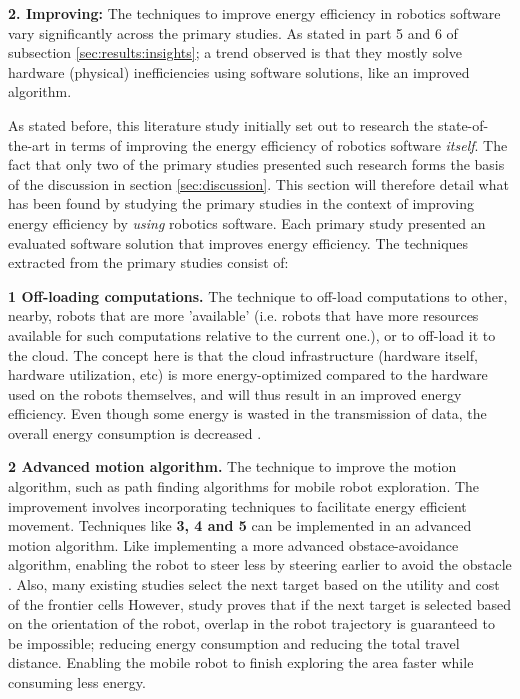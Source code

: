 \vspace{2mm}

\noindent\textbf{2. Improving:}
The techniques to improve energy efficiency in robotics software vary significantly across the primary studies. 
As stated in part 5 and 6 of subsection \ref{sec:results:insights}; a trend observed is that they mostly solve hardware (physical) 
inefficiencies using software solutions, like an improved algorithm.

As stated before, this literature study initially set out to research the state-of-the-art in terms of improving the
energy efficiency of robotics software \textit{itself}.
The fact that only two of the primary studies presented such research forms the basis of the discussion in section \ref{sec:discussion}. 
This section will therefore detail what has been found by studying the primary studies in the context of improving energy efficiency 
by \textit{using} robotics software.
Each primary study presented an evaluated software solution that improves energy efficiency.
The techniques extracted from the primary studies consist of:

\vspace{1mm}

\textbf{1 Off-loading computations.} The technique to off-load computations to other, nearby, robots that are more 'available' 
(i.e. robots that have more resources available for such computations relative to the current one.), or to off-load it to the cloud.
The concept here is that the cloud infrastructure (hardware itself, hardware utilization, etc) is more energy-optimized compared to the
hardware used on the robots themselves, and will thus result in an improved energy efficiency.
Even though some energy is wasted in the transmission of data, the overall energy consumption is decreased \cite{rahman2019cloud_robot_offloading}.
    
\vspace{1mm}

\textbf{2 Advanced motion algorithm.} The technique to improve the motion algorithm, such as path finding algorithms for mobile robot exploration. 
The improvement involves incorporating techniques to facilitate energy efficient movement.
Techniques like \textbf{3, 4 and 5} can be implemented in an advanced motion algorithm.
Like implementing a more advanced obstace-avoidance algorithm, enabling the robot to steer less by steering earlier to avoid the obstacle \cite{xie2018mecanum_wheel}.
Also, many existing studies select the next target based on the utility and cost of the frontier cells 
\cite{burgard2005multi_robot_exploration, simmons2000multi_robot_exploration,zlot2002multi_robot_exploration} 
However, study \cite{mei2006mobile_exploration} proves that if the next target is selected based on the orientation of the robot, 
overlap in the robot trajectory is guaranteed to be impossible; reducing energy consumption and reducing the total travel distance.
Enabling the mobile robot to finish exploring the area faster while consuming less energy.
    
